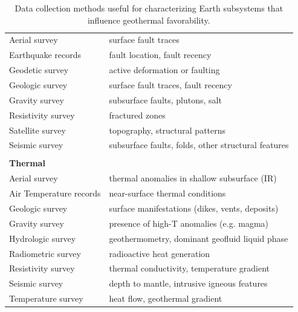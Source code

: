 \begin{table}
\begin{tabular}{ll}
Aerial survey           & surface fault traces                                     \\
Earthquake records      & fault location, fault recency                                  \\
Geodetic survey         & active deformation or faulting                           \\
Geologic survey         & surface fault traces, fault recency                      \\
Gravity survey          & subsurface faults, plutons, salt                         \\
Resistivity survey      & fractured zones                                          \\
Satellite survey        & topography, structural patterns                          \\
Seismic survey          & subsurface faults, folds, other structural features      \\
                        &                                                          \\
\textbf{Thermal}        &                                                          \\ \hline
Aerial survey           & thermal anomalies in shallow subsurface (IR)             \\
Air Temperature records & near-surface thermal conditions                          \\
Geologic survey         & surface manifestations (dikes, vents, deposits)          \\
Gravity survey          & presence of high-T anomalies (e.g. magma)                \\
Hydrologic survey       & geothermometry, dominant geofluid liquid phase           \\
Radiometric survey      & radioactive heat generation                              \\
Resistivity survey      & thermal conductivity, temperature gradient               \\
Seismic survey          & depth to mantle, intrusive igneous features              \\
Temperature survey      & heat flow, geothermal gradient                          
\end{tabular}
\caption[Data collection methods for geothermal subsystems]{Data collection methods useful for characterizing Earth subsystems that influence geothermal favorability.}
\label{tab:survey_types}
\end{table}

